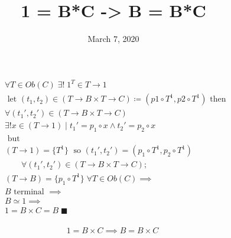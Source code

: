 \documentclass[fleqn, 11pt]{article}
\date{March 7, 2020}
\title{1 = B*C -> B = B*C}
\begin{document}

\begin{equation*}
\begin{aligned}
& \forall T \in Ob(C) \; \exists! \; 1^T \in
  T \rightarrow 1 \\
& \text{ let } (t_1, t_2) \in
  (T \rightarrow  B \times T \rightarrow C)
  \coloneqq (p1 \circ T^1, p2 \circ T^1)
  \text{ then } \\
& \forall (t_1', t_2') \in
  (T \rightarrow  B \times T \rightarrow C) \\
& \exists! x \in (T \rightarrow 1) \mid
  t_1' = p_1 \circ x \land t_2' = p_2 \circ x \\
& \text{ but } \\
& (T \rightarrow 1) = \{T^1\} \;
  \text{ so }
  (t_1', t_2') = (p_1 \circ T^1, p_2 \circ T^1) \\
& \qquad \forall (t_1', t_2') \in
  (T \rightarrow B \times T \rightarrow C); \\
& (T \rightarrow B) = \{p_1 \circ T^1\} \;
  \forall T \in Ob(C) \implies \\
& B \text{ terminal } \implies \\
& B \simeq 1 \implies \\
& 1 = B \times C = B \; \blacksquare \\
\end{aligned}
\end{equation*}

\hrulefill

$$ 1 = B \times C \implies B = B \times C \ $$
\end{document}
